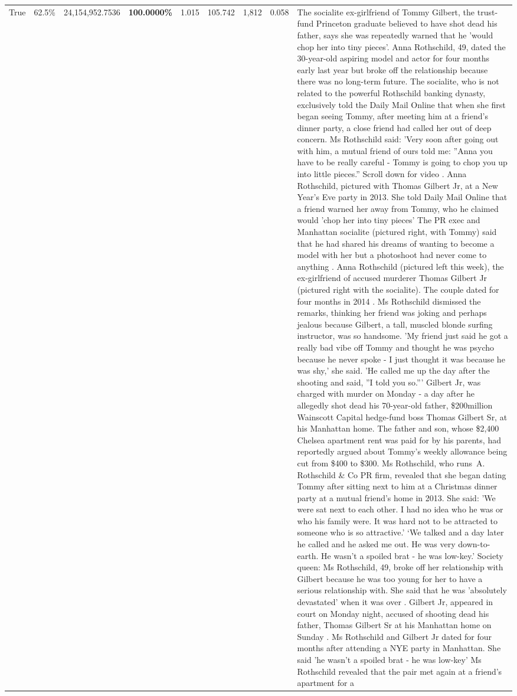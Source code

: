 \begin{table}[H]
\begin{tabular}{lllrlllll}
True & 62.5\% & 24,154,952.7536 & \bfseries \color{red} 100.0000\% & 1.015 & 105.742 & 1,812 & 0.058 & The socialite ex-girlfriend of Tommy Gilbert, the trust-fund Princeton graduate believed to have shot dead his father, says she was repeatedly warned that he 'would chop her into tiny pieces'. Anna Rothschild, 49, dated the 30-year-old aspiring model and actor for four months early last year but broke off the relationship because there was no long-term future. The socialite, who is not related to the powerful Rothschild banking dynasty, exclusively told the Daily Mail Online that when she first began seeing Tommy, after meeting him at a friend's dinner party, a close friend had called her out of deep concern. Ms Rothschild said: 'Very soon after going out with him, a mutual friend of ours told me: ''Anna you have to be really careful - Tommy is going to chop you up into little pieces.'' Scroll down for video . Anna Rothschild, pictured with Thomas Gilbert Jr, at a New Year's Eve party in 2013. She told Daily Mail Online that a friend warned her away from Tommy, who he claimed would 'chop her into tiny pieces' The PR exec and Manhattan socialite (pictured right, with Tommy) said that he had shared his dreams of wanting to become a model with her but a photoshoot had never come to anything . Anna Rothschild (pictured left this week), the ex-girlfriend of accused murderer Thomas Gilbert Jr (pictured right with the socialite). The couple dated for four months in 2014 . Ms Rothschild dismissed the remarks, thinking her friend was joking and perhaps jealous because Gilbert, a tall, muscled blonde surfing instructor, was so handsome. 'My friend just said he got a really bad vibe off Tommy and thought he was psycho because he never spoke - I just thought it was because he was shy,' she said. 'He called me up the day after the shooting and said, ''I told you so.''' Gilbert Jr, was charged with murder on Monday - a day after he allegedly shot dead his 70-year-old father, \$200million Wainscott Capital hedge-fund boss Thomas Gilbert Sr, at his Manhattan home. The father and son, whose \$2,400 Chelsea apartment rent was paid for by his parents, had reportedly argued about Tommy's weekly allowance being cut from \$400 to \$300. Ms Rothschild, who runs A. Rothschild \& Co PR firm, revealed that she began dating Tommy after sitting next to him at a Christmas dinner party at a mutual friend's home in 2013. She said: 'We were sat next to each other. I had no idea who he was or who his family were. It was hard not to be attracted to someone who is so attractive.' ‘We talked and a day later he called and he asked me out. He was very down-to-earth. He wasn’t a spoiled brat - he was low-key.’ Society queen: Ms Rothschild, 49, broke off her relationship with Gilbert because he was too young for her to have a serious relationship with. She said that he was 'absolutely devastated' when it was over . Gilbert Jr, appeared in court on Monday night, accused of shooting dead his father, Thomas Gilbert Sr at his Manhattan home on Sunday . Ms Rothschild and Gilbert Jr dated for four months after attending a NYE party in Manhattan. She said 'he wasn't a spoiled brat - he was low-key' Ms Rothschild revealed that the pair met again at a friend’s apartment for a 
\end{tabular}
\end{table}
